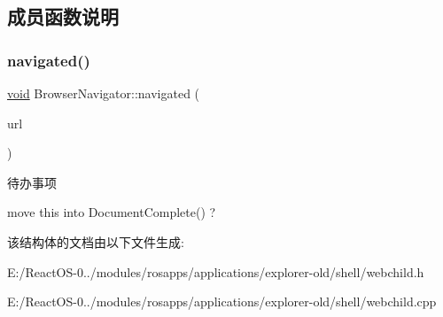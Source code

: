 \subsection{成员函数说明}
\mbox{\label{struct_browser_navigator_ad6dc6468c14e4c4979361686e0e156db}} 
\subsubsection{\texorpdfstring{navigated()}{navigated()}}
{\footnotesize\ttfamily \hyperlink{interfacevoid}{void} Browser\+Navigator\+::navigated (\begin{DoxyParamCaption}\item[{L\+P\+C\+T\+S\+TR}]{url }\end{DoxyParamCaption})}

\begin{DoxyRefDesc}{待办事项}
\item[\hyperlink{todo__todo000049}{待办事项}]move this into Document\+Complete() ? \end{DoxyRefDesc}


该结构体的文档由以下文件生成\+:\begin{DoxyCompactItemize}
\item 
E\+:/\+React\+O\+S-\/0../modules/rosapps/applications/explorer-\/old/shell/webchild.\+h\item 
E\+:/\+React\+O\+S-\/0../modules/rosapps/applications/explorer-\/old/shell/webchild.\+cpp\end{DoxyCompactItemize}
